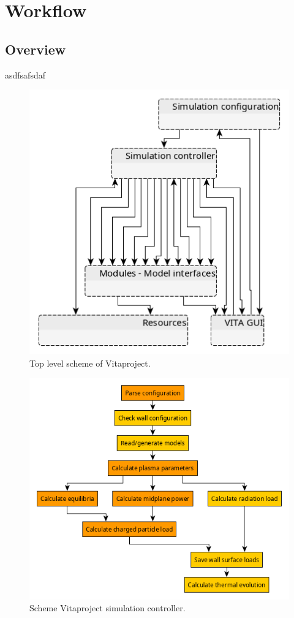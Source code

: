 \chapter{Workflow}

\section{Overview}

asdfsafsdaf


\begin{figure}[htb]
	\centering
	\includegraphics[width=0.60\linewidth]{images/Scheme-top-level}
	\caption{Top level scheme of Vitaproject.}
	\label{fig:scheme-top-level}
\end{figure}

\begin{figure}[htb]
	\centering
	\includegraphics[width=0.90\linewidth]{images/Scheme-simulation-controller}
	\caption{Scheme Vitaproject simulation controller.}
	\label{fig:scheme-top-level}
\end{figure}
